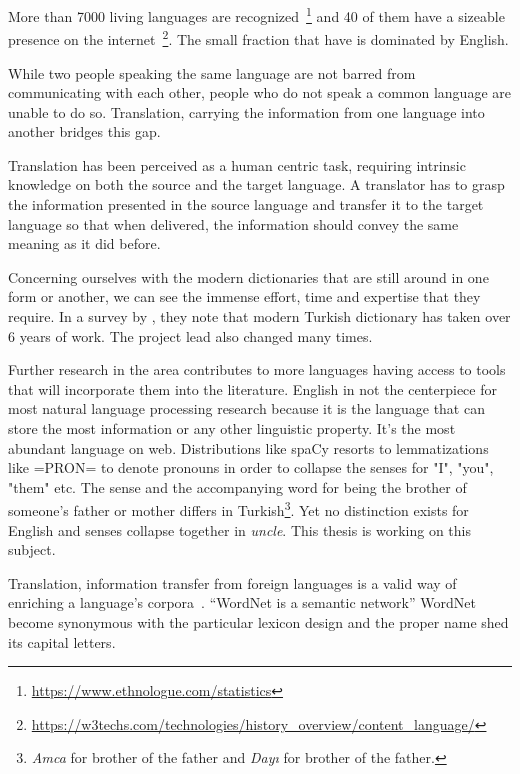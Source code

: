 
More than 7000 living languages are recognized~\footnote{\url{https://www.ethnologue.com/statistics}} and 40 of them have a sizeable presence on the internet~\footnote{\url{https://w3techs.com/technologies/history_overview/content_language/}}.
The small fraction that have is dominated by English.

While two people speaking the same language are not barred from communicating with each other, people who do not speak a common language are unable to do so.
Translation, carrying the information from one language into another bridges this gap.

Translation has been perceived as a human centric task, requiring intrinsic knowledge on both the source and the target language.
A translator has to grasp the information presented in the source language and transfer it to the target language so that when delivered, the information should convey the same meaning as it did before.

Concerning ourselves with the modern dictionaries that are still around in one form or another, we can see the immense effort, time and expertise that they require.
In a survey by \textcite{uzun_1945ten_1999}, they note that modern Turkish dictionary has taken over 6 years of work.
The project lead also changed many times.

Further research in the area contributes to more languages having access to tools that will incorporate them into the literature.
English in not the centerpiece for most natural language processing research because it is the language that can store the most information or any other linguistic property.
It's the most abundant language on web.
Distributions like spaCy resorts to lemmatizations like =PRON= to denote pronouns in order to collapse the senses for "I", "you", "them" etc\@.
The sense and the accompanying word for being the brother of someone's father or mother differs in Turkish\footnote{\emph{Amca} for brother of the father and \emph{Dayı} for brother of the father.}.
Yet no distinction exists for English and senses collapse together in \emph{uncle}.
This thesis is working on this subject.

Translation, information transfer from foreign languages is a valid way of enriching a language's corpora~\cite{ibrahim_usta_turkce_2006}.
\enquote{WordNet is a semantic network}\cite{fellbaum_wordnet_1998}
WordNet become synonymous with the particular lexicon design and the proper name shed its capital letters.

